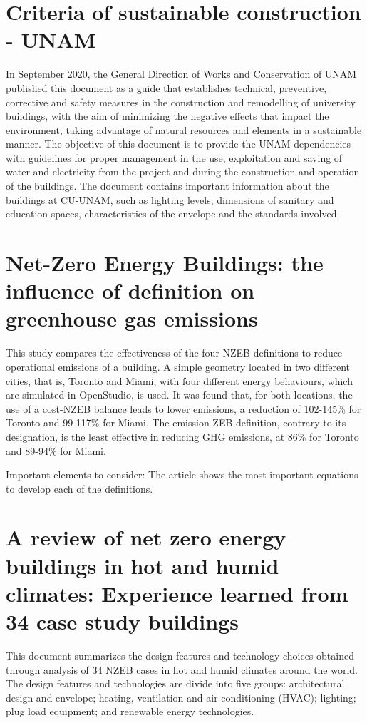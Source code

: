 \section{Criteria of sustainable construction - UNAM}
In September 2020, the General Direction of Works and Conservation of UNAM published this document as a guide that establishes technical, preventive, corrective and safety measures in the construction and remodelling of university buildings, with the aim of minimizing the negative effects that impact the environment, taking advantage of natural resources and elements in a sustainable manner.  The objective of this document is to provide the UNAM dependencies with guidelines for proper management in the use, exploitation and saving of water and electricity from the project and during the construction and operation of the buildings. The document contains important information about the buildings at CU-UNAM, such as lighting levels, dimensions of sanitary and education spaces, characteristics of the envelope and the standards involved.

\section{Net-Zero Energy Buildings: the influence of definition on greenhouse gas emissions}

This study compares the effectiveness of the four NZEB definitions to reduce operational emissions of a building. A simple geometry located in two different cities, that is, Toronto and Miami, with four different energy behaviours, which are simulated in OpenStudio, is used. It was found that, for both locations, the use of a cost-NZEB balance leads to lower emissions, a reduction of 102-145$\%$ for Toronto and 99-117$\%$ for Miami. The emission-ZEB definition, contrary to its designation, is the least effective in reducing GHG emissions, at 86$\%$ for Toronto and 89-94$\%$ for Miami.

Important elements to consider: The article shows the most important equations to develop each of the definitions.


\section{A review of net zero energy buildings in hot and humid climates: Experience learned from 34 case study buildings}

This document summarizes the design features and technology choices obtained through analysis of 34 NZEB cases in hot and humid climates around the world. The design features and technologies are divide into five groups: architectural design and envelope; heating, ventilation and air-conditioning (HVAC); lighting; plug load equipment; and renewable energy technologies. 

